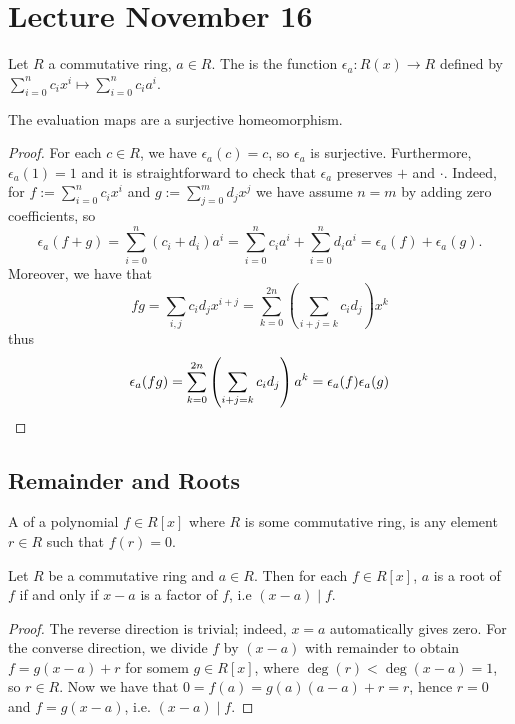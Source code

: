 \section{Lecture November 16}

\begin{defbox}
    Let $R$ a commutative ring, $a \in R$. The  is the function $\epsilon_a \colon R(x) \to R$ defined by $\sum_{i = 0}^n c_ix^i \mapsto \sum_{i = 0}^n c_ia^i$.
\end{defbox}

\begin{propbox}
    The evaluation maps are a surjective homeomorphism.
\end{propbox}

\begin{proof}
    For each $c \in R$, we have $\epsilon_a(c) = c$, so $\epsilon_a$ is surjective. Furthermore, $\epsilon_a(1) = 1$ and it is straightforward to check that $\epsilon_a$ preserves $+$ and $\cdot$. Indeed, for $f := \sum_{i=0}^nc_ix^i$ and $g := \sum_{j = 0}^m d_jx^j$ we have assume $n = m$ by adding zero coefficients, so
    \[ \epsilon_a(f+g) = \sum_{i = 0}^n(c_i + d_i)a^i = \sum_{i = 0}^{n}c_ia^i + \sum_{i = 0}^{n}d_ia^i = \epsilon_a(f)+\epsilon_a(g). \]
    Moreover, we have that
    \[ fg = \sum_{i,j}c_id_jx^{i+j} = \sum_{k = 0}^{2n}\left(\sum_{i + j = k} c_id_j\right)x^k\]
    thus 
    \[ \epsilon_a(fg) = \sum_{k = 0}^{2n}\left(\sum_{i + j = k} c_id_j\right)a^k = \epsilon_a(f)\epsilon_a(g) \qedhere\]
\end{proof}

\subsection{Remainder and Roots}

\begin{defbox}
    A  of a polynomial $f \in R[x]$ where $R$ is some commutative ring, is any element $r \in R$ such that $f(r) = 0$. 
\end{defbox}

\begin{propbox}
    Let $R$ be a commutative ring and $a \in R$. Then for each $f \in R[x]$, $a$ is a root of $f$ if and only if $x - a$ is a factor of $f$, i.e $(x - a) \mid f$.
\end{propbox}

\begin{proof}
    The reverse direction is trivial; indeed, $x = a$ automatically gives zero. For the converse direction, we divide $f$ by $(x-a)$ with remainder to obtain $f = g(x-a) + r$ for somem $g \in R[x]$, where $\deg(r) < \deg(x-a) = 1$, so $r \in R$. Now we have that $0 = f(a) = g(a)(a-a) + r = r$, hence $r = 0$ and $f = g(x-a)$, i.e. $(x-a)\mid f$. 
\end{proof}

